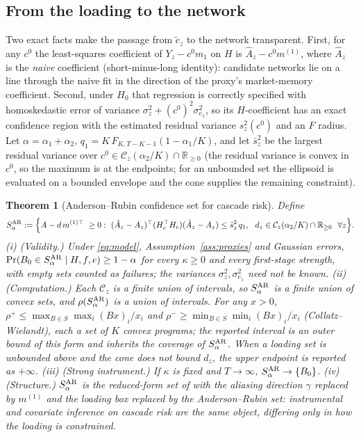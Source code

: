 \documentclass[12pt]{article}
\theoremstyle{plain}\newtheorem{theorem}{Theorem}[section]\newtheorem{proposition}[theorem]{Proposition}\newtheorem{lemma}[theorem]{Lemma}\newtheorem{corollary}[theorem]{Corollary}
\theoremstyle{definition}\newtheorem{definition}[theorem]{Definition}\newtheorem{assumption}[theorem]{Assumption}\newtheorem{remark}[theorem]{Remark}
\newcommand{\R}{\mathbb{R}}\newcommand{\E}{\mathbb{E}}\newcommand{\Cov}{\operatorname{Cov}}\newcommand{\Var}{\operatorname{Var}}\newcommand{\spn}{\operatorname{span}}\newcommand{\kap}{\kappa}\newcommand{\cone}{\mathcal K}\newcommand{\Bhat}{\widehat B}
\begin{document}
\subsection{From the loading to the network}
Two exact facts make the passage from $\tilde c_z$ to the network transparent. First, for any $c^0$ the least-squares coefficient of $Y_z-c^0m_1$ on $H$ is $\hat A_z-c^0m^{(1)}$, where $\hat A_z$ is the \emph{naive} coefficient (short-minus-long identity): candidate networks lie on a line through the naive fit in the direction of the proxy's market-memory coefficient. Second, under $H_0$ that regression is correctly specified with homoskedastic error of variance $\sigma_z^2+(c^0)^2\sigma_{e_1}^2$, so its $H$-coefficient has an exact confidence region with the estimated residual variance $s_z^2(c^0)$ and an $F$ radius. Let $\alpha=\alpha_1+\alpha_2$, $q_1=K\,F_{K,T-K-1}(1-\alpha_1/K)$, and let $\bar s_z^2$ be the largest residual variance over $c^0\in\mathcal C_z(\alpha_2/K)\cap\R_{\ge0}$ (the residual variance is convex in $c^0$, so the maximum is at the endpoints; for an unbounded set the ellipsoid is evaluated on a bounded envelope and the cone supplies the remaining constraint).
\begin{theorem}[Anderson--Rubin confidence set for cascade risk]\label{thm:ar}
Define
\[
S^{\rm AR}_\alpha:=\Bigl\{A-d\,m^{(1)\top}\ \ge0:\ (\hat A_z-A_z)^{\top}(H_c^\top H_c)(\hat A_z-A_z)\le\bar s_z^2\,q_1,\ \ d_z\in\mathcal C_z(\alpha_2/K)\cap\R_{\ge0}\ \ \forall z\Bigr\}.
\]
(i) \emph{(Validity.)} Under \eqref{eq:model}, Assumption~\ref{ass:proxies} and Gaussian errors, $\Pr(B_0\in S^{\rm AR}_\alpha\mid H,f,e)\ge1-\alpha$ for every $\kap\ge0$ and every first-stage strength, with empty sets counted as failures; the variances $\sigma_z^2,\sigma_{e_1}^2$ need not be known.
(ii) \emph{(Computation.)} Each $\mathcal C_z$ is a finite union of intervals, so $S^{\rm AR}_\alpha$ is a finite union of convex sets, and $\rho(S^{\rm AR}_\alpha)$ is a union of intervals. For any $x>0$, $\rho^+\le\max_{B\in S}\max_i(Bx)_i/x_i$ and $\rho^-\ge\min_{B\in S}\min_i(Bx)_i/x_i$ (Collatz--Wielandt), each a set of $K$ convex programs; the reported interval is an outer bound of this form and inherits the coverage of $S^{\rm AR}_\alpha$. When a loading set is unbounded above and the cone does not bound $d_z$, the upper endpoint is reported as $+\infty$.
(iii) \emph{(Strong instrument.)} If $\kap$ is fixed and $T\to\infty$, $S^{\rm AR}_\alpha\to\{B_0\}$.
(iv) \emph{(Structure.)} $S^{\rm AR}_\alpha$ is the reduced-form set of \citet{companion2026} with the aliasing direction $\gamma$ replaced by $m^{(1)}$ and the loading box replaced by the Anderson--Rubin set: instrumental and covariate inference on cascade risk are the same object, differing only in how the loading is constrained.
\end{theorem}
\end{document}
